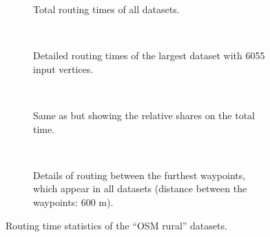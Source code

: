 			\begin{figure}[h!]
				\begin{figcenter}
					\begin{subfigure}[t]{\textwidth}
						\begin{figcenter}
							
						\end{figcenter}
						\caption{Total routing times of all datasets.}
					\end{subfigure}
					\\[3ex]
					\begin{subfigure}[t]{\textwidth}
						\begin{figcenter}
							
						\end{figcenter}
						\caption{Detailed routing times of the largest dataset with 6055 input vertices.}
						\label{fig:eval-rural-routing-details-b}
					\end{subfigure}
					\\[3ex]
					\begin{subfigure}[t]{\textwidth}
						\begin{figcenter}
							
						\end{figcenter}
						\caption{Same as  but showing the relative shares on the total time.}
					\end{subfigure}
					\\[3ex]
					\begin{subfigure}[t]{\textwidth}
						\begin{figcenter}
							
						\end{figcenter}
						\caption{Details of routing between the furthest waypoints, which appear in all datasets (distance between the waypoints: 600 m).}
					\end{subfigure}
				\end{figcenter}
				\caption{Routing time statistics of the \enquote{OSM rural} datasets.}
			\end{figure}
			
		
		
